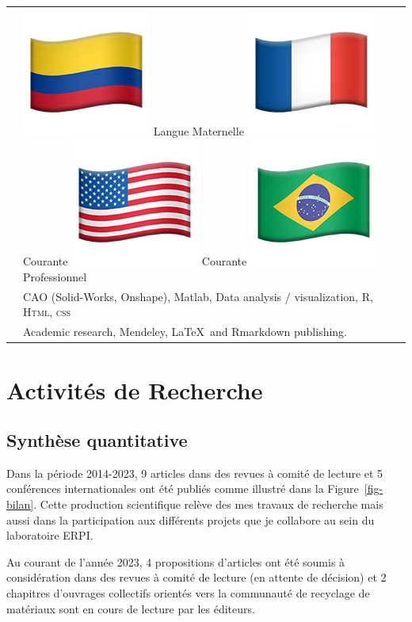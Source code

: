 \documentclass[
  11pt,
]{article}
\begin{document}
\extrarowsep=3pt
\begin{tabu} to \linewidth {X[0.1,l] X[2,l]}

  & 
\includegraphics[width=2ex]{Figures/icons/flag-colombia.png} Langue Maternelle\quad 
\includegraphics[width=2ex]{Figures/icons/flag-france.png} Courante  \quad\includegraphics[width=2ex]{Figures/icons/flag-usa.png} Courante  \quad
\includegraphics[width=2ex]{Figures/icons/flag-brazil.png} Professionnel \\[5pt] 


  & CAO (Solid-Works, Onshape), Matlab,  Data analysis / visualization, R, \textsc{Html, css} \\[5pt]
    

  & Academic research,  Mendeley, \LaTeX ~and Rmarkdown publishing.

\end{tabu}

\hypertarget{activituxe9s-de-recherche}{%
\section{Activités de Recherche}\label{activituxe9s-de-recherche}}

\hypertarget{synthuxe8se-quantitative}{%
\subsection{Synthèse quantitative}\label{synthuxe8se-quantitative}}

Dans la période 2014-2023, 9 articles dans des revues à comité de
lecture et 5 conférences internationales ont été publiés comme illustré
dans la Figure~\ref{fig-bilan}. Cette production scientifique relève des
mes travaux de recherche mais aussi dans la participation aux différents
projets que je collabore au sein du laboratoire ERPI.

Au courant de l'année 2023, 4 propositions d'articles ont été soumis à
considération dans des revues à comité de lecture (en attente de
décision) et 2 chapitres d'ouvrages collectifs orientés vers la
communauté de recyclage de matériaux sont en cours de lecture par les
éditeurs.
\end{document}
